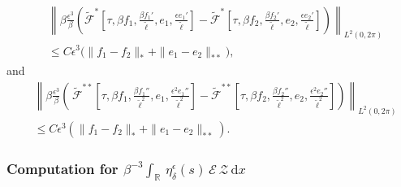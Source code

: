 \documentclass[10pt, reqno]{amsart}
\numberwithin{equation}{section}
\theoremstyle{definition}
\begin{document}
{\begin{align*}
\end{align*}
\begin{align*}
& \left\| \beta \frac{\epsilon^3}{\beta}\left(\tilde{\mathcal F}^{*} \left[\tau, \beta f_1, \frac{\beta {f_1}'}{\tilde\ell}, e_1, \frac{\epsilon e_1'}{\tilde\ell}\right]
- \tilde{\mathcal F}^{*} \left[\tau, \beta f_2, \frac{\beta {f_2}'}{\tilde\ell}, e_2, \frac{\epsilon e_2'}{\tilde\ell}\right] \right) \right\|_{L^2(0, 2\pi)}
\nonumber\\[2mm]
&
\le C \epsilon^3 \big(\|f_1- f_2\|_*+ \|e_1- e_2\|_{**}\big),
\end{align*}
and
\begin{align*}
& \left\| \beta \frac{\epsilon^3}{\beta}\left(\, \tilde{\mathcal F}^{**} \left[\tau, \beta f_1,\frac{\beta f_1''}{\tilde\ell^2} ,  e_1, \frac{\epsilon^2 e_1''}{\tilde\ell^2}\right]
-
\tilde{\mathcal F}^{**} \left[\tau, \beta f_2, \frac{\beta f_2''}{\tilde\ell^2}, e_2, \frac{\epsilon^2 e_2''}{\tilde\ell^2}\right] \right) \right\|_{L^2(0, 2\pi)}
\nonumber\\[2mm]
&
\le C \epsilon^3 \left(\|f_1- f_2\|_*+ \|e_1- e_2\|_{**}\right).
\end{align*}

\medskip
\medskip
\subsubsection{Computation for $\beta^{-3}\int_{{\mathbb R}}\, \eta_\delta^\epsilon(s)\, {\mathcal E}\,{\mathcal Z} \,{\mathrm d}x$}\

}
\end{document}
